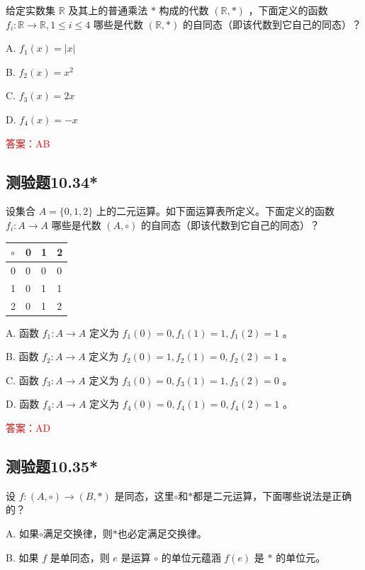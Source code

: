 \documentclass[UTF8, heading=true]{ctexart}
\begin{document}
给定实数集 $\mathbb{R}$ 及其上的普通乘法 $*$ 构成的代数 $(\mathbb{R}, *)$ ，下面定义的函数 $f_i: \mathbb{R} \rightarrow \mathbb{R}, 1 \leq i \leq 4$ 哪些是代数 $(\mathbb{R}, *)$ 的自同态（即该代数到它自己的同态）？

A. $ f_1(x)=|x|$

B. $f_2(x)=x^2$

C. $f_3(x)=2 x$

D. $f_4(x)=-x$

\textcolor{red}{答案：AB}

\subsection{测验题10.34*}

设集合 $A=\{0,1,2\}$ 上的二元运算。如下面运算表所定义。下面定义的函数 $f_i: A \rightarrow A$ 哪些是代数 $(A, \circ)$ 的自同态（即该代数到它自己的同态）？
\begin{table}[H]
  \renewcommand{\arraystretch}{1.5}
  \centering
\begin{tabular}{l|lll}
\hline$\circ$ & 0 & 1 & 2 \\
\hline 0 & 0 & 0 & 0 \\
1 & 0 & 1 & 1 \\
2 & 0 & 1 & 2 \\
\hline
\end{tabular}
\end{table}

A. 函数 $f_1: A \rightarrow A$ 定义为 $f_1(0)=0, f_1(1)=1, f_1(2)=1$ 。

B. 函数 $f_2: A \rightarrow A$ 定义为 $f_2(0)=1, f_2(1)=0, f_2(2)=1$ 。

C. 函数 $f_3: A \rightarrow A$ 定义为 $f_3(0)=0, f_3(1)=1, f_3(2)=0$ 。

D. 函数 $f_4: A \rightarrow A$ 定义为 $f_4(0)=0, f_4(1)=0, f_4(2)=1$ 。

\textcolor{red}{答案：AD}

\subsection{测验题10.35*}

设 $f:(A, \circ) \rightarrow(B, *)$ 是同态，这里$\circ$和$*$都是二元运算，下面哪些说法是正确的？

A. 如果$\circ$满足交换律，则$*$也必定满足交换律。

B. 如果 $f$ 是单同态，则 $e$ 是运算 $\circ$ 的单位元蕴涵 $f(e)$ 是 $*$ 的单位元。
\end{document}
